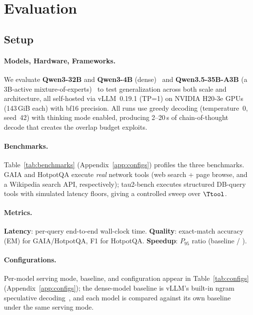 \section{Evaluation}
\label{sec:experiments}

\subsection{Setup}
\label{sec:setup}

\paragraph{Models, Hardware, Frameworks.}
We evaluate \textbf{Qwen3-32B} and \textbf{Qwen3-4B} (dense)~\citep{yang_qwen3_2025} and
\textbf{Qwen3.5-35B-A3B} (a 3B-active mixture-of-experts)~\citep{qwen_qwen35_2026} to
test generalization across both scale and architecture, all self-hosted via
vLLM~0.19.1 (TP=1) on NVIDIA H20-3e GPUs (143\,GiB each) with bf16 precision.
All runs use greedy decoding (temperature~0, seed~42) with thinking mode enabled,
producing 2--20\,s of chain-of-thought decode that creates the overlap budget \spork{} exploits.

\paragraph{Benchmarks.}
Table~\ref{tab:benchmarks} (Appendix~\ref{app:configs}) profiles the three benchmarks.
GAIA and HotpotQA execute \emph{real} network tools (web search + page browse, and a
Wikipedia search API, respectively); tau2-bench executes structured DB-query tools with
simulated latency floors, giving a controlled sweep over $\Ttool$.

\paragraph{Metrics.}
\textbf{Latency}: per-query end-to-end wall-clock time.
\textbf{Quality}: exact-match accuracy (EM) for GAIA/HotpotQA, F1 for HotpotQA.
\textbf{Speedup}: $P_{95}$ ratio (baseline / \spork{}).

\paragraph{Configurations.}
Per-model serving mode, baseline, and \spork{} configuration appear in
Table~\ref{tab:configs} (Appendix~\ref{app:configs}); the dense-model baseline is
vLLM's built-in ngram speculative decoding~\citep{saxena_pld_2023}, and each model is
compared against its own baseline under the same serving mode.

